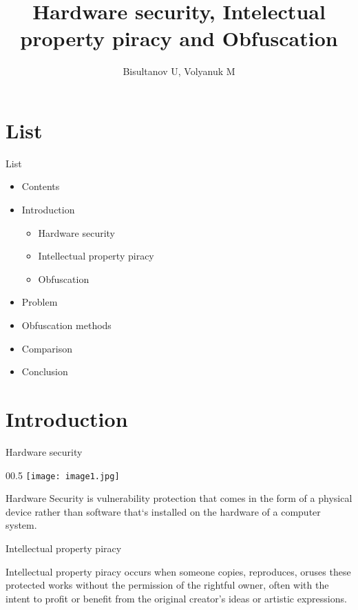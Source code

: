 \documentclass{beamer}
\title{Hardware security, Intelectual property piracy and Obfuscation}
\author{Bisultanov U, Volyanuk M}
\date{}
\begin{document}
\begin{frame}{}
    \titlepage
\end{frame}


\section{List}
\begin{frame}{List}

    \begin{itemize}[<+->]
        \item Contents  
        \item Introduction
            \begin{itemize}
                \item<2-> Hardware security
                \item<2-> Intellectual property piracy
                \item<2-> Obfuscation
            \end{itemize}
        \item Problem 
        \item Obfuscation methods
        \item Comparison
        \item Conclusion 
    \end{itemize}

\end{frame}


\section{Introduction}
\begin{frame}{Hardware security}

\begin{wrapfigure}{0}{0.5\textwidth}
\texttt{[image: image1.jpg]} 
\label{fig:wrapfig1}
\end{wrapfigure}

    Hardware Security is vulnerability protection that comes in the form of a physical device rather than software that`s installed on the hardware of a computer system.
    
\end{frame}


\begin{frame}{Intellectual property piracy}
\begin{alertblock}{Intellectual property piracy}
     occurs when someone copies, reproduces, oruses these protected works without the permission of the rightful owner, often with the intent to profit or benefit from the original creator’s ideas or artistic expressions.
\end{alertblock}

\end{frame}
\end{document}
